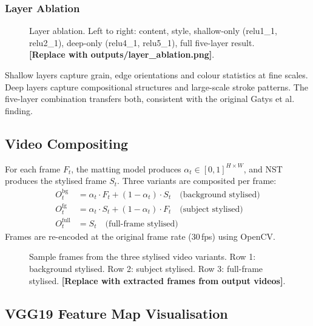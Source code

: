 \documentclass[11pt,a4paper]{article}
\begin{document}
\subsubsection{Layer Ablation}

\begin{figure}[h]
\centering
\fbox{\rule{0pt}{4cm}\rule{\linewidth}{0pt}}
\caption{Layer ablation. Left to right: content, style, shallow-only
(relu1\_1, relu2\_1), deep-only (relu4\_1, relu5\_1), full five-layer result.
\textbf{[Replace with outputs/layer\_ablation.png]}.}
\label{fig:layer_ablation}
\end{figure}

Shallow layers capture grain, edge orientations and colour statistics at fine scales.
Deep layers capture compositional structures and large-scale stroke patterns. The
five-layer combination transfers both, consistent with the original Gatys et al. finding.

\subsection{Video Compositing}

For each frame $F_t$, the matting model produces $\alpha_t \in [0,1]^{H\times W}$,
and NST produces the stylised frame $S_t$. Three variants are composited per frame:
\begin{align}
  O^{\text{bg}}_t   &= \alpha_t \cdot F_t + (1-\alpha_t) \cdot S_t
    \quad \text{(background stylised)} \\
  O^{\text{fg}}_t   &= \alpha_t \cdot S_t + (1-\alpha_t) \cdot F_t
    \quad \text{(subject stylised)} \\
  O^{\text{full}}_t &= S_t
    \quad \text{(full-frame stylised)}
\end{align}
Frames are re-encoded at the original frame rate (30\,fps) using OpenCV.

\begin{figure}[h]
\centering
\fbox{\rule{0pt}{5cm}\rule{\linewidth}{0pt}}
\caption{Sample frames from the three stylised video variants.
Row 1: background stylised. Row 2: subject stylised. Row 3: full-frame stylised.
\textbf{[Replace with extracted frames from output videos]}.}
\label{fig:video_frames}
\end{figure}

\subsection{VGG19 Feature Map Visualisation}
\end{document}
